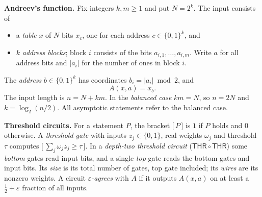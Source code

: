 \documentclass[11pt,letterpaper]{article}
\theoremstyle{remark}
\newcommand{\bits}{\{0,1\}}
\newcommand{\ind}[1]{\bigl[\,#1\,\bigr]}
\newcommand{\smalltitle}[1]{\textbf{\color{ink}#1}\quad}
\newcommand{\THR}{\mathsf{THR}}
\begin{document}
\smalltitle{Andreev's function.}
Fix integers $k,m\ge1$ and put $N=2^k$. The input consists of
\begin{itemize}
\item a \emph{table} $x$ of $N$ bits $x_c$, one for each address
      $c\in\bits^k$, and
\item $k$ \emph{address blocks}; block $i$ consists of the bits
      $a_{i,1},\dots,a_{i,m}$. Write $a$ for all address bits and
      $|a_i|$ for the number of ones in block $i$.
\end{itemize}
The \emph{address} $b\in\bits^k$ has coordinates $b_i=|a_i|\bmod2$, and
\[
A(x,a)=x_b .
\]
The input length is $n=N+km$. In the \emph{balanced case} $km=N$, so $n=2N$
and $k=\log_2(n/2)$. All asymptotic statements refer to the balanced case.

\smalltitle{Threshold circuits.}
For a statement $P$, the bracket $\ind{P}$ is $1$ if $P$ holds and $0$
otherwise. A \emph{threshold gate} with inputs $z_j\in\bits$, real weights
$\omega_j$ and threshold $\tau$ computes $\ind{\sum_j\omega_jz_j\ge\tau}$. In a \emph{depth-two threshold
circuit} ($\THR\circ\THR$) some \emph{bottom} gates read input bits, and a
single \emph{top} gate reads the bottom gates and input bits. Its
\emph{size} is its total number of gates, top gate included; its
\emph{wires} are its nonzero weights. A circuit
\emph{$\varepsilon$-agrees} with $A$ if it outputs $A(x,a)$ on at least a
$\tfrac12+\varepsilon$ fraction of all inputs.
\end{document}
